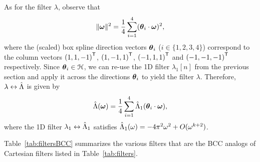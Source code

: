 As for the filter $\lambda$, observe that
\begin{equation}
  \lVert\boldsymbol{\omega}\rVert^2 = \frac{1}{4}\sum_{i=1}^4
  (\boldsymbol{\theta}_i \cdot \boldsymbol{\omega})^2,
\end{equation}
where the (scaled) box spline direction vectors $\boldsymbol{\theta}_i$ ($i \in \{1,2,3,4\}$) correspond to the column vectors ${(1,1,-1)}^{\mathsf{T}}$, ${(1,-1,1)}^{\mathsf{T}}$, ${(-1,1,1)}^{\mathsf{T}}$ and ${(-1,-1,-1)}^{\mathsf{T}}$ respectively. Since $\boldsymbol{\theta}_i \in \mathcal{H}$, we can re-use the 1D filter $\lambda_1[n]$ from the previous section and apply it across the directions $\boldsymbol{\theta}_i$ to yield the filter $\lambda$.
Therefore, $\lambda \leftrightarrow \hat{\Lambda}$ is given by
\begin{equation}
  \hat{\Lambda}(\boldsymbol{\omega}) = \frac{1}{4}\sum_{i=1}^4
  \hat{\Lambda}_1(\boldsymbol{\theta}_i \cdot \boldsymbol{\omega}),
\end{equation}
where the 1D filter $\lambda_1 \leftrightarrow \hat{\Lambda}_1$ satisfies  $\hat{\Lambda}_1(\omega) = -4\pi^2\omega^2 + O(\omega^{k+2})$.

Table~\ref{tab:filtersBCC} summarizes the various filters that are the BCC analogs of Cartesian filters listed in Table~\ref{tab:filters}.

